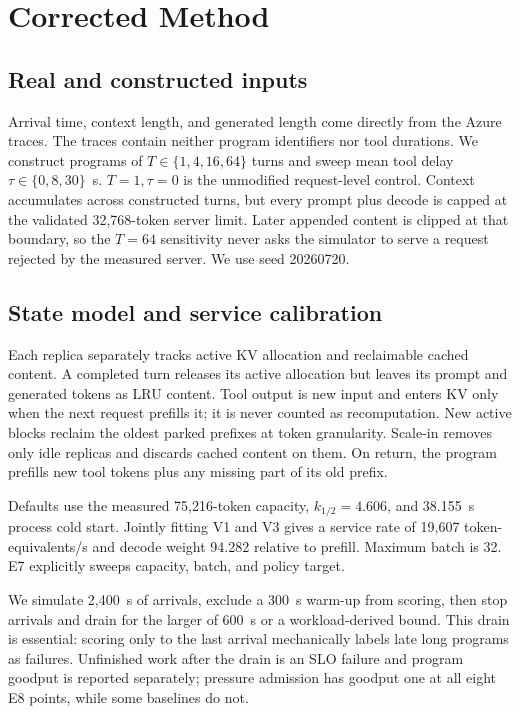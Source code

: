 \documentclass[sigconf,nonacm]{acmart}
\begin{document}
\section{Corrected Method}

\subsection{Real and constructed inputs}

Arrival time, context length, and generated length come directly from the Azure
traces. The traces contain neither program identifiers nor tool durations. We
construct programs of $T\in\{1,4,16,64\}$ turns and sweep mean tool delay
$\tau\in\{0,8,30\}$~s. $T=1,\tau=0$ is the unmodified request-level control.
Context accumulates across constructed turns, but every prompt plus decode is
capped at the validated 32,768-token server limit. Later appended content is
clipped at that boundary, so the $T=64$ sensitivity never asks the simulator to
serve a request rejected by the measured server. We use seed 20260720.

\subsection{State model and service calibration}

Each replica separately tracks active KV allocation and reclaimable cached
content. A completed turn releases its active allocation but leaves its prompt
and generated tokens as LRU content. Tool output is new input and enters KV only
when the next request prefills it; it is never counted as recomputation. New
active blocks reclaim the oldest parked prefixes at token granularity. Scale-in
removes only idle replicas and discards cached content on them. On return, the
program prefills new tool tokens plus any missing part of its old prefix.

Defaults use the measured 75,216-token capacity, $k_{1/2}=4.606$, and
38.155~s process cold start. Jointly fitting V1 and V3 gives a service rate of
19,607 token-equivalents/s and decode weight 94.282 relative to prefill. Maximum
batch is 32. E7 explicitly sweeps capacity, batch, and policy target.

We simulate 2,400~s of arrivals, exclude a 300~s warm-up from scoring, then
stop arrivals and drain for the larger of 600~s or a workload-derived bound.
This drain is essential: scoring only to the last arrival mechanically labels
late long programs as failures. Unfinished work after the drain is an SLO
failure and program goodput is reported separately; pressure admission has
goodput one at all eight E8 points, while some baselines do not.
\end{document}
